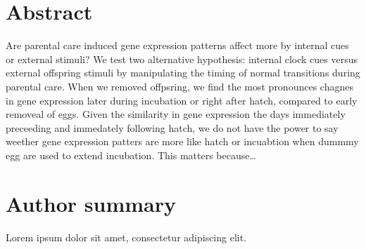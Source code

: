 \documentclass[10pt,letterpaper]{article}
\newcommand{\getIndex}[2]{
  \ForEach{,}{\IfEq{#1}{\thislevelitem}{\number\thislevelcount\ExitForEach}{}}{#2}
}
\newcommand{\getAff}[1]{
  \getIndex{#1}{UC Davis,UNH}
}
\begin{document}
\vspace*{0.2in}

\section*{Abstract}
Are parental care induced gene expression patterns affect more by
internal cues or external stimuli? We test two alternative hypothesis:
internal clock cues versus external offspring stimuli by manipulating
the timing of normal transitions during parental care. When we removed
offpsring, we find the most pronounces chagnes in gene expression later
during incubation or right after hatch, compared to early removeal of
eggs. Given the similarity in gene expression the days immediately
preceeding and immedately following hatch, we do not have the power to
say weether gene expression patters are more like hatch or incuabtion
when dummmy egg are used to extend incubation. This matters
because\ldots{}

\section*{Author summary}
Lorem ipsum dolor sit amet, consectetur adipiscing elit.
\end{document}
